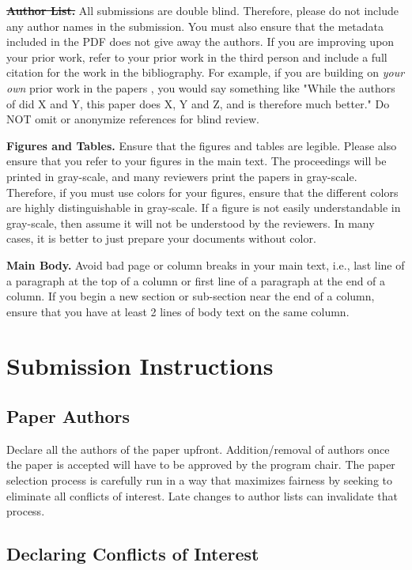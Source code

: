\documentclass[pageno]{jpaper}
\begin{document}
\noindent\textbf{\sout{Author List.}} All submissions are double
blind. Therefore, please do not include any author names in the
submission. You must also ensure that the metadata included in the
PDF does not give away the authors. If you are improving upon your
prior work, refer to your prior work in the third person and include
a full citation for the work in the bibliography. For example, if
you are building on {\em your own} prior work in the papers \cite{nicepaper,nicepaper2}, 
you would say something like "While the authors of \cite{nicepaper,nicepaper2} did X and Y,
this paper does X, Y and Z, and is therefore much better."  Do NOT omit or
anonymize references for blind review.

\noindent\textbf{Figures and Tables.} Ensure that the figures and
tables are legible.  Please also ensure that you refer to your
figures in the main text. The proceedings will be printed in
gray-scale, and many reviewers print the papers in
gray-scale. Therefore, if you must use colors for your figures, ensure
that the different colors are highly distinguishable in gray-scale.
If a figure is not easily understandable in gray-scale, then assume
it will not be understood by the reviewers.  In many cases, it
is better to just prepare your documents without color.

\noindent\textbf{Main Body.} Avoid bad page or column breaks in
your main text, i.e., last line of a paragraph at the top of a
column or first line of a paragraph at the end of a column. If you
begin a new section or sub-section near the end of a column,
ensure that you have at least 2 lines of body text on the same
column. 

\section{Submission Instructions}

\subsection{Paper Authors}

Declare all the authors of the paper upfront. Addition/removal of authors once
the paper is accepted will have to be approved by the program chair.  The
paper selection process is carefully run in a way that maximizes fairness
by seeking to eliminate all conflicts of interest.  Late changes to author 
lists can invalidate that process.

\subsection{Declaring Conflicts of Interest}
\end{document}
